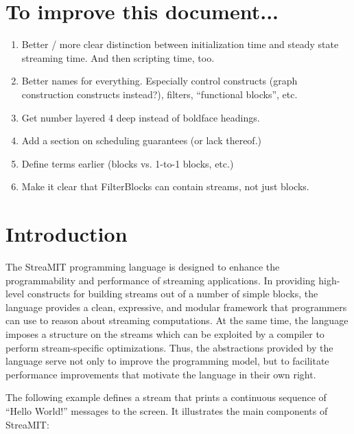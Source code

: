 \documentclass[draft]{article}
\begin{document}
\section{To improve this document...}

\begin{enumerate}

\item Better / more clear distinction between initialization time and
steady state streaming time.  And then scripting time, too.

\item Better names for everything.  Especially control constructs
(graph construction constructs instead?), filters, ``functional
blocks'', etc.

\item Get number layered 4 deep instead of boldface headings.

\item Add a section on scheduling guarantees (or lack thereof.)

\item Define terms earlier (blocks vs. 1-to-1 blocks, etc.)

\item Make it clear that FilterBlocks can contain streams, not just
blocks.

\end{enumerate}

\section{Introduction}
\label{sec:intro}

The StreaMIT programming language is designed to enhance the
programmability and performance of streaming applications.  In
providing high-level constructs for building streams out of a number
of simple blocks, the language provides a clean, expressive, and
modular framework that programmers can use to reason about streaming
computations.  At the same time, the language imposes a structure on
the streams which can be exploited by a compiler to perform
stream-specific optimizations.  Thus, the abstractions provided by the
language serve not only to improve the programming model, but to
facilitate performance improvements that motivate the language in
their own right.

The following example defines a stream that prints a continuous
sequence of ``Hello World!'' messages to the screen.  It illustrates
the main components of StreaMIT:
\end{document}
